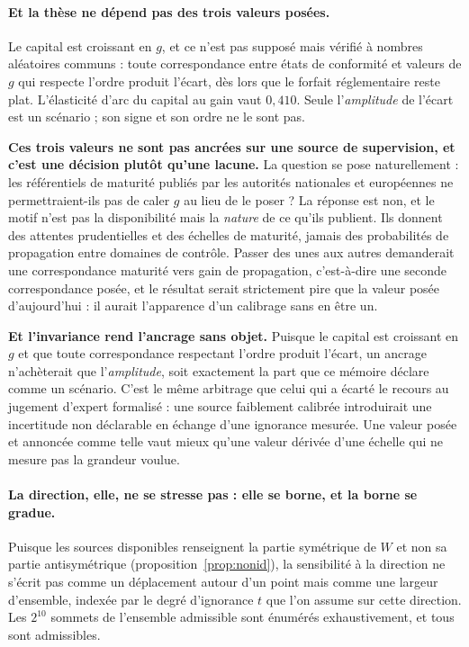 \paragraph{Et la thèse ne dépend pas des trois valeurs posées.} Le capital est croissant en $g$,
et ce n'est pas supposé mais vérifié à nombres aléatoires communs : toute
correspondance entre états de conformité et valeurs de $g$ qui respecte l'ordre produit
l'écart, dès lors que le forfait réglementaire reste plat. L'élasticité d'arc du capital au gain
vaut $0{,}410$. Seule l'\emph{amplitude} de l'écart est un scénario ; son signe et son ordre ne
le sont pas.

\begin{attention}
\textbf{Ces trois valeurs ne sont pas ancrées sur une source de supervision, et c'est une
décision plutôt qu'une lacune.} La question se pose naturellement : les référentiels de maturité
publiés par les autorités nationales et européennes ne permettraient-ils pas de caler $g$ au lieu
de le poser ? La réponse est non, et le motif n'est pas la disponibilité mais la \emph{nature} de
ce qu'ils publient. Ils donnent des attentes prudentielles et des échelles de maturité, jamais des
probabilités de propagation entre domaines de contrôle. Passer des unes aux autres demanderait une
correspondance maturité vers gain de propagation, c'est-à-dire une seconde correspondance
posée, et le résultat serait strictement pire que la valeur posée d'aujourd'hui : il aurait
l'apparence d'un calibrage sans en être un.

\textbf{Et l'invariance rend l'ancrage sans objet.} Puisque le capital est croissant en $g$ et que
toute correspondance respectant l'ordre produit l'écart, un ancrage n'achèterait que
l'\emph{amplitude}, soit exactement la part que ce mémoire déclare comme un scénario. C'est le
même arbitrage que celui qui a écarté le recours au jugement d'expert formalisé : une source
faiblement calibrée introduirait une incertitude non déclarable en échange d'une ignorance
mesurée. Une valeur posée et annoncée comme telle vaut mieux qu'une valeur dérivée d'une échelle
qui ne mesure pas la grandeur voulue.
\end{attention}

\paragraph{La direction, elle, ne se stresse pas : elle se borne, et la borne se gradue.} Puisque
les sources disponibles renseignent la partie symétrique de $W$ et non sa partie antisymétrique
(proposition~\ref{prop:nonid}), la sensibilité à
la direction ne s'écrit pas comme un déplacement autour d'un point mais comme une largeur
d'ensemble, indexée par le degré d'ignorance $t$ que l'on assume sur cette direction. Les
$2^{10}$ sommets de l'ensemble admissible sont énumérés exhaustivement, et tous sont admissibles.

